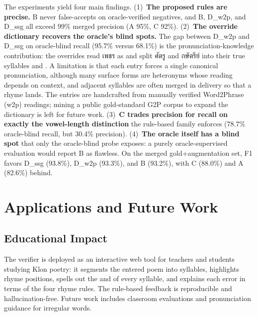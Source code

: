\documentclass[conference]{IEEEtran}
\newcommand{\thtxt}[1]{{\thaifont #1}}      %
\newcommand{\thtxt}[1]{}
\begin{document}
The experiments yield four main findings. (1)~\textbf{The proposed rules are
precise.} B never false-accepts on oracle-verified negatives, and B,
D\_w2p, and D\_ssg all exceed 99\% merged precision (A 95\%, C 92\%).
(2)~\textbf{The override dictionary recovers the oracle's blind spots.}
The gap between D\_w2p and D\_ssg on oracle-blind recall (95.7\% versus
68.1\%) is the pronunciation-knowledge contribution: the overrides read
\thtxt{เพชร} as  and split \thtxt{ศัตรู} and \thtxt{กษัตรีย์}
into their true syllables  and .
A limitation is that each entry forces a single canonical pronunciation,
although many surface forms are heteronyms whose reading depends on
context, and adjacent syllables are often merged in delivery so that a
rhyme lands. The entries are handcrafted from manually verified Word2Phrase
(w2p) readings; mining a public gold-standard G2P corpus to expand the
dictionary is left for future work. (3)~\textbf{C trades precision for
recall on exactly the vowel-length distinction} the rule-based family
enforces (78.7\% oracle-blind recall, but 30.4\% precision).
(4)~\textbf{The oracle itself has a blind spot} that only the oracle-blind
probe exposes: a purely oracle-supervised evaluation would report B as
flawless. On the merged gold+augmentation set, F1 favors D\_ssg (93.8\%),
D\_w2p (93.3\%), and B (93.2\%), with C (88.0\%) and A (82.6\%) behind.


\section{Applications and Future Work}

\subsection{Educational Impact}

The verifier is deployed as an interactive web tool for teachers and
students studying Klon poetry: it segments the entered poem into syllables,
highlights rhyme positions, spells out the  and
 of every syllable, and explains each error in terms of the
four rhyme rules. The rule-based feedback is reproducible and
hallucination-free. Future work includes classroom evaluations and
pronunciation guidance for irregular words.
\end{document}
